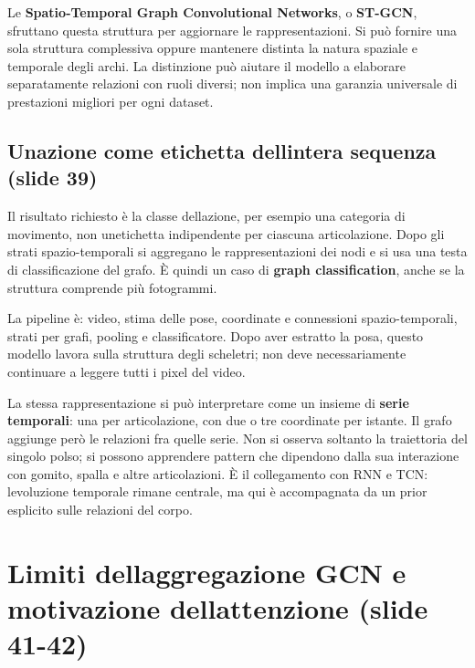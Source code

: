 \documentclass[11pt,a4paper,oneside,openany]{book}
\begin{document}
Le \textbf{Spatio-Temporal Graph Convolutional Networks}, o \textbf{ST-GCN}, sfruttano questa struttura per aggiornare le rappresentazioni. Si può fornire una sola struttura complessiva oppure mantenere distinta la natura spaziale e temporale degli archi. La distinzione può aiutare il modello a elaborare separatamente relazioni con ruoli diversi; non implica una garanzia universale di prestazioni migliori per ogni dataset.

\subsection{Un\textquotesingle azione come etichetta dell\textquotesingle intera sequenza (slide 39)}\label{f05-n30-r793}

Il risultato richiesto è la classe dell\textquotesingle azione, per esempio una categoria di movimento, non un\textquotesingle etichetta indipendente per ciascuna articolazione. Dopo gli strati spazio-temporali si aggregano le rappresentazioni dei nodi e si usa una testa di classificazione del grafo. È quindi un caso di \textbf{graph classification}, anche se la struttura comprende più fotogrammi.

La pipeline è: video, stima delle pose, coordinate e connessioni spazio-temporali, strati per grafi, pooling e classificatore. Dopo aver estratto la posa, questo modello lavora sulla struttura degli scheletri; non deve necessariamente continuare a leggere tutti i pixel del video.

La stessa rappresentazione si può interpretare come un insieme di \textbf{serie temporali}: una per articolazione, con due o tre coordinate per istante. Il grafo aggiunge però le relazioni fra quelle serie. Non si osserva soltanto la traiettoria del singolo polso; si possono apprendere pattern che dipendono dalla sua interazione con gomito, spalla e altre articolazioni. È il collegamento con RNN e TCN: l\textquotesingle evoluzione temporale rimane centrale, ma qui è accompagnata da un prior esplicito sulle relazioni del corpo.

\section{Limiti dell\textquotesingle aggregazione GCN e motivazione dell\textquotesingle attenzione (slide 41-42)}\label{f05-n30-r801}
\end{document}
